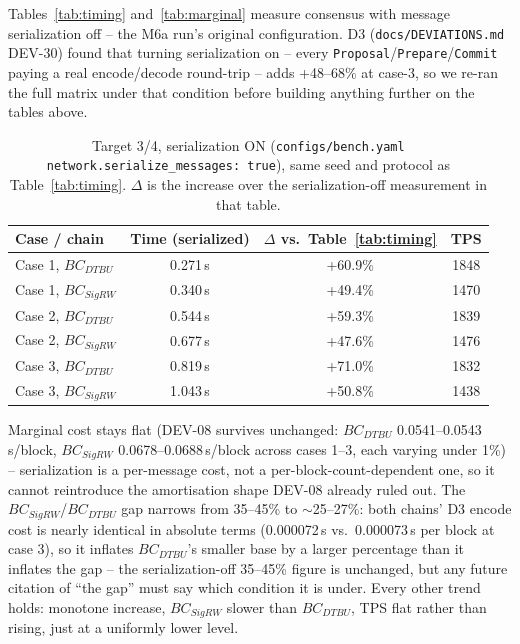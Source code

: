 \documentclass[conference]{IEEEtran}
\begin{document}
Tables~\ref{tab:timing} and~\ref{tab:marginal} measure consensus with message serialization off --
the M6a run's original configuration. D3 (\texttt{docs/DEVIATIONS.md} DEV-30) found that turning
serialization on -- every \texttt{Proposal}/\texttt{Prepare}/\texttt{Commit} paying a real
encode/decode round-trip -- adds +48--68\% at case-3, so we re-ran the full matrix under that
condition before building anything further on the tables above.

\begin{table}[t]
\centering
\caption{Target 3/4, serialization ON (\texttt{configs/bench.yaml}
\texttt{network.serialize\_messages: true}), same seed and protocol as Table~\ref{tab:timing}.
$\Delta$ is the increase over the serialization-off measurement in that table.}
\label{tab:timing-serialized}
\footnotesize
\begin{tabular}{lccc}
\hline
\textbf{Case / chain} & \textbf{Time (serialized)} & \textbf{$\Delta$ vs.\ Table~\ref{tab:timing}} & \textbf{TPS} \\
\hline
Case 1, $BC_{DTBU}$  & 0.271\,s & +60.9\% & 1848 \\
Case 1, $BC_{SigRW}$ & 0.340\,s & +49.4\% & 1470 \\
Case 2, $BC_{DTBU}$  & 0.544\,s & +59.3\% & 1839 \\
Case 2, $BC_{SigRW}$ & 0.677\,s & +47.6\% & 1476 \\
Case 3, $BC_{DTBU}$  & 0.819\,s & +71.0\% & 1832 \\
Case 3, $BC_{SigRW}$ & 1.043\,s & +50.8\% & 1438 \\
\hline
\end{tabular}
\end{table}

Marginal cost stays flat (DEV-08 survives unchanged: $BC_{DTBU}$ 0.0541--0.0543\,s/block,
$BC_{SigRW}$ 0.0678--0.0688\,s/block across cases 1--3, each varying under 1\%) -- serialization is
a per-message cost, not a per-block-count-dependent one, so it cannot reintroduce the amortisation
shape DEV-08 already ruled out. The $BC_{SigRW}$/$BC_{DTBU}$ gap narrows from 35--45\% to
$\sim$25--27\%: both chains' D3 encode cost is nearly identical in absolute terms
(0.000072\,s vs.\ 0.000073\,s per block at case 3), so it inflates $BC_{DTBU}$'s smaller base by a
larger percentage than it inflates the gap -- the serialization-off 35--45\% figure is unchanged,
but any future citation of ``the gap'' must say which condition it is under. Every other trend
holds: monotone increase, $BC_{SigRW}$ slower than $BC_{DTBU}$, TPS flat rather than rising, just
at a uniformly lower level.
\end{document}
